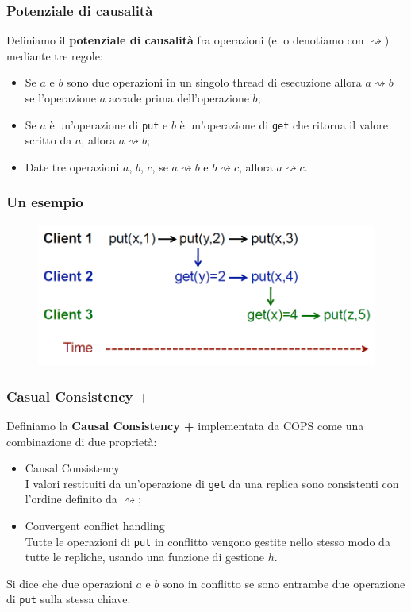 \begin{frame}
\frametitle{Potenziale di causalità}
	\begin{definizione}
	Definiamo il \textbf{potenziale di causalità} fra operazioni (e lo denotiamo con $\rightsquigarrow$)
	mediante tre regole:
	\begin{itemize}
		\item<1-> Se $a$ e $b$ sono due operazioni in un singolo thread di esecuzione
				  allora $a \rightsquigarrow b$ se l'operazione $a$ accade prima dell'operazione $b$;
		\item<1-> Se $a$ è un'operazione di \texttt{put} e $b$ è un'operazione di
				  \texttt{get} che ritorna il valore scritto da $a$, allora $a \rightsquigarrow b$;
		\item<1-> Date tre operazioni $a$, $b$, $c$, se $a \rightsquigarrow b$ e $b 
				  \rightsquigarrow c$, allora $a \rightsquigarrow c$.
	\end{itemize}
	\end{definizione}
\end{frame}

\begin{frame}
\frametitle{Un esempio}
	\begin{figure}
		\centering
		\includegraphics[scale=0.40]{COPS/COPS2.png}
	\end{figure}
\end{frame}

\begin{frame}
\frametitle{Casual Consistency +}
\begin{definizione}
Definiamo la \textbf{Causal Consistency +} implementata da COPS come una combinazione di due proprietà:
	\begin{itemize}
		\item<1-> Causal Consistency \\
				  I valori restituiti da un'operazione di \texttt{get} da una replica sono 
				  consistenti con l'ordine definito da $\rightsquigarrow$;
		\item<1-> Convergent conflict handling \\
				  Tutte le operazioni di \texttt{put} in conflitto vengono gestite nello
				  stesso modo da tutte le repliche, usando una funzione di gestione $h$.
	\end{itemize}
\end{definizione}

\begin{definizione}
Si dice che due operazioni $a$ e $b$ sono in conflitto se sono entrambe
due operazione di \texttt{put} sulla stessa chiave.
\end{definizione}
\end{frame}

